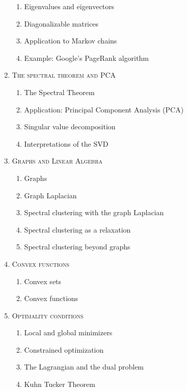 \begin{enumerate}[label=\textbf{\arabic*.}]
\vspace{-0.2cm}
\begin{enumerate}[label=\arabic*.,noitemsep]
\item Eigenvalues and eigenvectors
\item Diagonalizable matrices
\item Application to Markov chains
\item Example: Google's PageRank algorithm
\end{enumerate}
\item \textsc{The spectral theorem and PCA}
\vspace{-0.2cm}
\begin{enumerate}[label=\arabic*.,noitemsep]
\item The Spectral Theorem
\item Application: Principal Component Analysis (PCA)
\item Singular value decomposition
\item Interpretations of the SVD
\end{enumerate}
\item \textsc{Graphs and Linear Algebra}
\vspace{-0.2cm}
\begin{enumerate}[label=\arabic*.,noitemsep]
\item Graphs
\item Graph Laplacian
\item Spectral clustering with the graph Laplacian
\item Spectral clustering as a relaxation
\item Spectral clustering beyond graphs
\end{enumerate}
\item \textsc{Convex functions}
\vspace{-0.2cm}
\begin{enumerate}[label=\arabic*.,noitemsep]
\item Convex sets
\item Convex functions
\end{enumerate}
\item \textsc{Optimality conditions}
\vspace{-0.2cm}
\begin{enumerate}[label=\arabic*.,noitemsep]
\item Local and global minimizers
\item Constrained optimization
\item The Lagrangian and the dual problem
\item Kuhn Tucker Theorem

\end{enumerate}
\end{enumerate}

